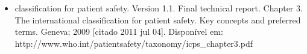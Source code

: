 \documentclass{article}
\begin{document}
\begin{itemize}
\item[%
23] %
          classification for patient safety. Version 1.1. Final technical report. Chapter 3. The
          international classification for patient safety. Key concepts and preferred terms. Geneva;
          2009 [citado 2011 jul 04]. Disponível em:
          http://www.who.int/patientsafety/taxonomy/icps\_{}chapter3.pdf  
 
\end{itemize}


\end{document}
